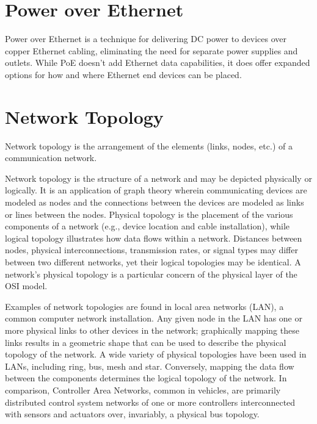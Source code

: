 \documentclass[a4paper,12pt]{article}
\begin{document}
\section{Power over Ethernet}
Power over Ethernet is a technique for delivering DC power to devices over copper Ethernet cabling, eliminating the need for separate power supplies and outlets. While PoE doesn't add Ethernet data capabilities, it does offer expanded options for how and where Ethernet end devices can be placed.


\section{Network Topology}

Network topology is the arrangement of the elements (links, nodes, etc.) of a communication network.

Network topology is the structure of a network and may be depicted physically or logically. It is an application of graph theory wherein communicating devices are modeled as nodes and the connections between the devices are modeled as links or lines between the nodes. Physical topology is the placement of the various components of a network (e.g., device location and cable installation), while logical topology illustrates how data flows within a network. Distances between nodes, physical interconnections, transmission rates, or signal types may differ between two different networks, yet their logical topologies may be identical. A network’s physical topology is a particular concern of the physical layer of the OSI model.

Examples of network topologies are found in local area networks (LAN), a common computer network installation. Any given node in the LAN has one or more physical links to other devices in the network; graphically mapping these links results in a geometric shape that can be used to describe the physical topology of the network. A wide variety of physical topologies have been used in LANs, including ring, bus, mesh and star. Conversely, mapping the data flow between the components determines the logical topology of the network. In comparison, Controller Area Networks, common in vehicles, are primarily distributed control system networks of one or more controllers interconnected with sensors and actuators over, invariably, a physical bus topology.
\clearpage
\end{document}
